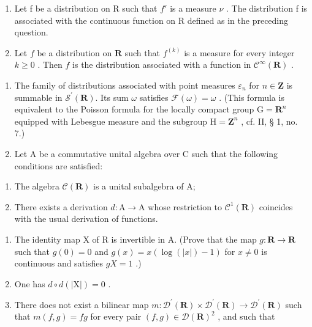 \begin{enumerate}
\def\labelenumi{\alph{enumi})}
\setcounter{enumi}{1}
\item
  Let f be a distribution on R such that \(f'\) is a measure \(\nu\) . The distribution f is associated with the continuous function on R defined as in the preceding question.
\item
  Let \(f\) be a distribution on \(\mathbf{R}\) such that \(f^{(k)}\) is a measure for every integer \(k \geqslant 0\) . Then \(f\) is the distribution associated with a function in \(\mathcal{C}^{\infty}(\mathbf{R})\) .
\end{enumerate}

\begin{enumerate}
\def\labelenumi{\arabic{enumi})}
\setcounter{enumi}{4}
\item
  The family of distributions associated with point measures \(\varepsilon_{n}\) for \(n\in\mathbf{Z}\) is summable in \(\mathcal{S}^{\prime}(\mathbf{R})\). Its sum \(\omega\) satisfies \(\mathcal{F}(\omega)=\omega\) . (This formula is equivalent to the Poisson formula for the locally compact group \(\mathrm{G}=\mathbf{R}^{n}\) equipped with Lebesgue measure and the subgroup \(\mathrm{H}=\mathbf{Z}^{n}\) , cf. II, § 1, no. 7.)
\item
  Let A be a commutative unital algebra over C such that the following conditions are satisfied:
\end{enumerate}

\begin{enumerate}
\def\labelenumi{(\roman{enumi})}
\item
  The algebra \(\mathcal{C}(\mathbf{R})\) is a unital subalgebra of A;
\item
  There exists a derivation \(d\colon\mathrm{A}\to\mathrm{A}\) whose restriction to \(\mathcal{C}^{1}(\mathbf{R})\) coincides with the usual derivation of functions.
\end{enumerate}

\begin{enumerate}
\def\labelenumi{\alph{enumi})}
\item
  The identity map X of R is invertible in A. (Prove that the map \(g: \mathbf{R} \to \mathbf{R}\) such that \(g(0) = 0\) and \(g(x) = x(\log(|x|) - 1)\) for \(x \neq 0\) is continuous and satisfies \(gX = 1\) .)
\item
  One has \(d \circ d(|\mathrm{X}|) = 0\) .
\item
  There does not exist a bilinear map \(m\colon\mathcal{D}^{\prime}(\mathbf{R})\times\mathcal{D}^{\prime}(\mathbf{R})\to\mathcal{D}^{\prime}(\mathbf{R})\) such that \(m(f,g)=fg\) for every pair \((f,g)\in\mathcal{D}(\mathbf{R})^{2}\) , and such that
\end{enumerate}

